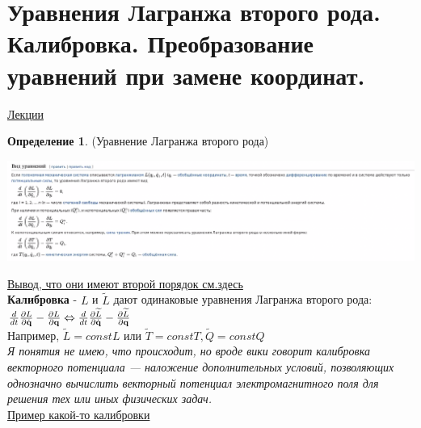 \documentclass[specialist, subf, href, colorlinks=true, 12pt, times, mtpro, final]{disser}
\theoremstyle{definition}
\newtheorem{defn}{Определение}[section]
\def\note{\textcolor{faded}}
\begin{document}
    
    \section{Уравнения Лагранжа второго рода. Калибровка. Преобразование уравнений при замене координат.}
     \label{7}
    \hyperlink {first_lects.29}{Лекции} \\
    \begin{defn}(Уравнение Лагранжа второго рода)
		\begin{center}
 			\includegraphics[scale=0.5]{pics/lagranzh}
		\end{center}
	\end{defn}
	
	\noindent\hyperlink {first_lects.29}{Вывод, что они имеют второй порядок см.здесь} \\
	
	\textbf{Калибровка} - $L$ и $\widetilde{L}$ дают одинаковые уравнения Лагранжа второго рода:\\
	$\frac{d}{dt}\frac{\partial L}{\partial \dot{\mathbf{q}}} - \frac{\partial L}{\partial \mathbf{q}} \Leftrightarrow \frac{d}{dt}\frac{\partial \widetilde{L}}{\partial \dot{\mathbf{q}}} - \frac{\partial \widetilde{L}}{\partial \mathbf{q}}$\\
	Например, $\widetilde{L} = const L$ или $\widetilde{T} = const  T, \widetilde{Q} = const Q$\\
	\note{\it Я понятия не имею, что происходит, но вроде вики говорит калибровка векторного потенциала — наложение дополнительных условий, позволяющих однозначно вычислить векторный потенциал электромагнитного поля для решения тех или иных физических задач.}\\
	
	\noindent\hyperlink {first_lects.30}{Пример какой-то калибровки} \\
	
\end{document}
